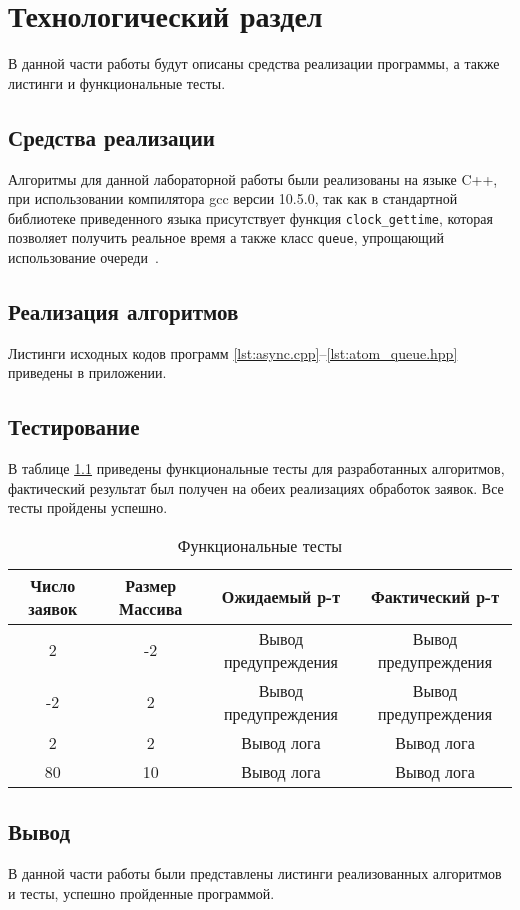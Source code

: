 \chapter{Технологический раздел}

В данной части работы будут описаны средства реализации программы, а также листинги и функциональные тесты.

\section{Средства реализации}
Алгоритмы для данной лабораторной работы были реализованы на языке C++, при использовании компилятора gcc версии 10.5.0, так как в стандартной библиотеке приведенного языка
присутствует функция \texttt{clock\_gettime}, которая  позволяет получить реальное время а также класс \texttt{queue}, упрощающий использование очереди~\cite{cpp-time,queue}.



\section{Реализация алгоритмов}
Листинги исходных кодов программ  \ref{lst:async.cpp}--\ref{lst:atom_queue.hpp} приведены в приложении.


\section{Тестирование}

В таблице \ref{t:tests} приведены функциональные тесты для разработанных алгоритмов, фактический результат был получен на обеих реализациях обработок заявок. Все тесты пройдены успешно.
\begin{table}[ht]
	\small
	\begin{center}
			\caption{Функциональные тесты}
			\label{t:tests}
		\begin{tabular}{|c|c|c|c|}
			\hline
			Число заявок & Размер Массива & Ожидаемый р-т & Фактический р-т \\
			\hline
			2 & -2 & Вывод предупреждения & Вывод предупреждения \\ 	\hline
			-2 & 2 & Вывод предупреждения & Вывод предупреждения \\ \hline
			2 & 2 & Вывод лога & Вывод лога \\ \hline
			80 & 10 &  Вывод лога & Вывод лога \\ \hline
		\end{tabular}
	\end{center}
\end{table}

\section*{Вывод}
В данной части работы были представлены листинги реализованных алгоритмов и тесты, успешно пройденные программой.